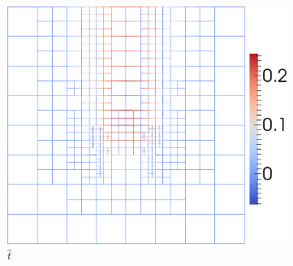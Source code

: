\documentclass[18pt,xcolor=table]{beamer}
\begin{document}
\begin{frame}[t]
\begin{columns}[t]
\begin{column}[c]{0.7\textwidth}
\begin{figure}[ht]
\begin{subfigure}[t]{0.45\textwidth}
\centering
\includegraphics[height=0.8\textwidth]{SpaceTimeHeat/PulseSource/fhat.png}
\\$\hat t$
\end{subfigure}
\end{figure}
\end{column}
\end{columns}
\end{frame}

\end{document}
